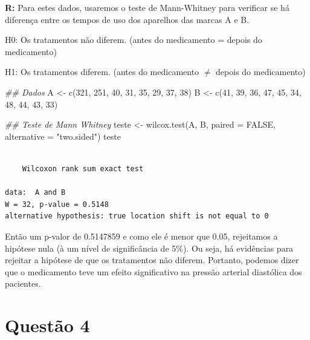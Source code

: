 \documentclass[
  letterpaper,
  DIV=11,
  numbers=noendperiod]{scrartcl}
\newenvironment{Shaded}{\begin{snugshade}}{\end{snugshade}}
\newcommand{\AttributeTok}[1]{\textcolor[rgb]{0.40,0.45,0.13}{#1}}
\newcommand{\ConstantTok}[1]{\textcolor[rgb]{0.56,0.35,0.01}{#1}}
\newcommand{\DecValTok}[1]{\textcolor[rgb]{0.68,0.00,0.00}{#1}}
\newcommand{\DocumentationTok}[1]{\textcolor[rgb]{0.37,0.37,0.37}{\textit{#1}}}
\newcommand{\FunctionTok}[1]{\textcolor[rgb]{0.28,0.35,0.67}{#1}}
\newcommand{\NormalTok}[1]{\textcolor[rgb]{0.00,0.23,0.31}{#1}}
\newcommand{\OtherTok}[1]{\textcolor[rgb]{0.00,0.23,0.31}{#1}}
\newcommand{\StringTok}[1]{\textcolor[rgb]{0.13,0.47,0.30}{#1}}
\begin{document}
\textbf{R:} Para estes dados, usaremos o teste de Mann-Whitney para
verificar se há diferença entre os tempos de uso dos aparelhos das
marcas A e B.

H0: Os tratamentos não diferem. (antes do medicamento = depois do
medicamento)

H1: Os tratamentos diferem. (antes do medicamento \(\neq\) depois do
medicamento)

\begin{Shaded}
\begin{Highlighting}[]
\DocumentationTok{\#\# Dados}
\NormalTok{A }\OtherTok{\textless{}{-}} \FunctionTok{c}\NormalTok{(}\DecValTok{321}\NormalTok{, }\DecValTok{251}\NormalTok{, }\DecValTok{40}\NormalTok{, }\DecValTok{31}\NormalTok{, }\DecValTok{35}\NormalTok{, }\DecValTok{29}\NormalTok{, }\DecValTok{37}\NormalTok{, }\DecValTok{38}\NormalTok{)}
\NormalTok{B }\OtherTok{\textless{}{-}} \FunctionTok{c}\NormalTok{(}\DecValTok{41}\NormalTok{, }\DecValTok{39}\NormalTok{, }\DecValTok{36}\NormalTok{, }\DecValTok{47}\NormalTok{, }\DecValTok{45}\NormalTok{, }\DecValTok{34}\NormalTok{, }\DecValTok{48}\NormalTok{, }\DecValTok{44}\NormalTok{, }\DecValTok{43}\NormalTok{, }\DecValTok{33}\NormalTok{)}


\DocumentationTok{\#\# Teste de Mann Whitney}
\NormalTok{teste }\OtherTok{\textless{}{-}} \FunctionTok{wilcox.test}\NormalTok{(A, B, }\AttributeTok{paired =} \ConstantTok{FALSE}\NormalTok{, }\AttributeTok{alternative =} \StringTok{"two.sided"}\NormalTok{)}
\NormalTok{teste}
\end{Highlighting}
\end{Shaded}

\begin{verbatim}

    Wilcoxon rank sum exact test

data:  A and B
W = 32, p-value = 0.5148
alternative hypothesis: true location shift is not equal to 0
\end{verbatim}

Então um p-valor de 0.5147859 e como ele é menor que 0.05, rejeitamos a
hipótese nula (à um nível de significância de 5\%). Ou seja, há
evidências para rejeitar a hipótese de que os tratamentos não diferem.
Portanto, podemos dizer que o medicamento teve um efeito significativo
na pressão arterial diastólica dos pacientes.

\section{Questão 4}\label{questuxe3o-4}
\end{document}
